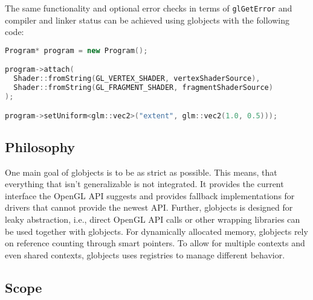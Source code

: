 \documentclass{article}
\begin{document}
\noindent The same functionality and optional error checks in terms of \lstinline|glGetError| and compiler and linker status can be achieved using globjects with the following code:
\begin{lstlisting}[language=c++,frame=single,basicstyle=\footnotesize]
Program* program = new Program();

program->attach(
  Shader::fromString(GL_VERTEX_SHADER, vertexShaderSource), 
  Shader::fromString(GL_FRAGMENT_SHADER, fragmentShaderSource)
);

program->setUniform<glm::vec2>("extent", glm::vec2(1.0, 0.5)));
\end{lstlisting}

\subsection{Philosophy}

One main goal of globjects is to be as strict as possible. This means, that everything that isn't generalizable is not integrated. It provides the current interface the OpenGL API suggests and provides fallback implementations for drivers that cannot provide the newest API. Further, globjects is designed for leaky abstraction, i.e., direct OpenGL API calls or other wrapping libraries can be used together with globjects. For dynamically allocated memory, globjects rely on reference counting through smart pointers. To allow for multiple contexts and even shared contexts, globjects uses registries to manage different behavior.

\subsection{Scope}
\end{document}
